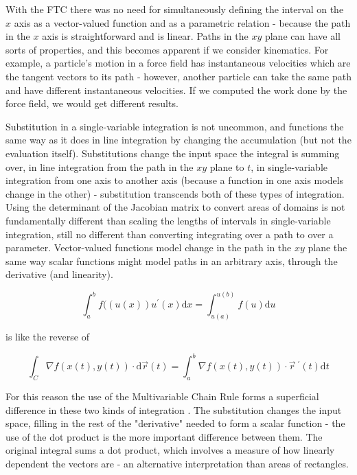 \documentclass[11pt]{article}
\newcommand{\dr}{\vec{r}~^{\prime}(t)}
\begin{document}
With the FTC there was no need for simultaneously defining the interval on the $x$ axis as a vector-valued function and as a parametric relation - because the path in the $x$ axis is straightforward and is linear. Paths in the $xy$ plane can have all sorts of properties, and this becomes apparent if we consider kinematics. For example, a particle's motion in a force field has instantaneous velocities which are the tangent vectors to its path - however, another particle can take the same path and have different instantaneous velocities. If we computed the work done by the force field, we would get different results.


Substitution in a single-variable integration is not uncommon, and functions the same way as it does in line integration by changing the accumulation (but not the evaluation itself). Substitutions change the input space the integral is summing over, in line integration from the path in the $xy$ plane to $t$, in single-variable integration from one axis to another axis (because a function in one axis models change in the other) - substitution transcends both of these types of integration. Using the determinant of the Jacobian matrix to convert areas of domains is not fundamentally different than scaling the lengths of intervals in single-variable integration, still no different than converting integrating over a path to over a parameter. Vector-valued functions model change in the path in the $xy$ plane the same way scalar functions might model paths in an arbitrary axis, through the derivative (and linearity).

$$\int_a^b f((u(x))u^{\prime}(x)\mathrm{d}x = \int_{u(a)}^{u(b)} f(u)\mathrm{d}u$$
\begin{center}
is like the reverse of
\end{center}$$\int_C \nabla f(x(t),y(t))\cdot \mathrm{d}\vec{r}(t) = \int_a^b \nabla f(x(t),y(t))\cdot \dr\mathrm{d}t$$

For this reason the use of the Multivariable Chain Rule forms a superficial difference in these two kinds of integration . The substitution changes the input space, filling in the rest of the "derivative" needed to form a scalar function - the use of the dot product is the more important difference between them. The original integral sums a dot product, which involves a measure of how linearly dependent the vectors are - an alternative interpretation than areas of rectangles.
\end{document}

